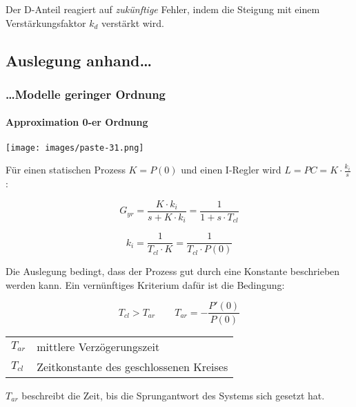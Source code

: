 \documentclass[
  10pt,
  a4paper,
  twocolumn]{article}
\makeatletter
\let\oldparagraph\paragraph
\renewcommand{\paragraph}[1]{\oldparagraph{#1}\mbox{}}
\numberwithin{equation}{section}
\newenvironment{conditions}
  {\par\vspace{\abovedisplayskip}\noindent\begin{tabular}{>{$}l<{$} @{${}:{}$} l}}
  {\end{tabular}\par\vspace{\belowdisplayskip}}
\let\paragraph\oldparagraph
\renewcommand{\paragraph}[1]{\oldparagraph{#1}\mbox{}\par}
\makeatother
\begin{document}
Der D-Anteil reagiert auf \emph{zukünftige} Fehler, indem die Steigung
mit einem Verstärkungsfaktor \(k_d\) verstärkt wird.

\newpage

\subsection{Auslegung anhand\ldots{}}\label{auslegung-anhand}

\subsubsection{\ldots Modelle geringer
Ordnung}\label{modelle-geringer-ordnung}

\paragraph{Approximation 0-er Ordnung}\label{approximation-0-er-ordnung}

\texttt{[image: images/paste-31.png]}

Für einen statischen Prozess \(K=P(0)\) und einen I-Regler wird
\(L=PC=K\cdot\frac{k_i}{s}\):

\[
G_{yr}=\frac{K\cdot k_i}{s+K\cdot k_i}=\frac1{1+s\cdot T_{cl}}
\]

\[
k_i = \frac{1}{T_{cl}\cdot K}=\frac1{T_{cl}\cdot P(0)}
\]

\begin{tcolorbox}[enhanced jigsaw, coltitle=black, colback=white, breakable, colframe=quarto-callout-caution-color-frame, rightrule=.15mm, left=2mm, opacityback=0, leftrule=.75mm, toptitle=1mm, colbacktitle=quarto-callout-caution-color!10!white, bottomtitle=1mm, arc=.35mm, bottomrule=.15mm, title=\textcolor{quarto-callout-caution-color}{\faFire}\hspace{0.5em}{mittlere Verzögerungszeit}, titlerule=0mm, toprule=.15mm, opacitybacktitle=0.6]

Die Auslegung bedingt, dass der Prozess gut durch eine Konstante
beschrieben werden kann. Ein vernünftiges Kriterium dafür ist die
Bedingung:

\[
T_{cl}>T_{ar}\qquad T_{ar}=-\frac{P'(0)}{P(0)}
\]

\begin{conditions}
  T_{ar} & mittlere Verzögerungszeit \\
  T_{cl} & Zeitkonstante des geschlossenen Kreises
\end{conditions}

\(T_{ar}\) beschreibt die Zeit, bis die Sprungantwort des Systems sich
gesetzt hat.

\end{tcolorbox}
\end{document}
